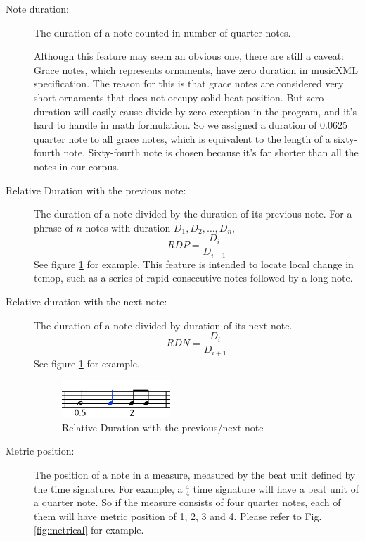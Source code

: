 \begin{description}
         
         \item [Note duration:] The duration of a note counted in number of quarter notes. 
            
            Although this feature may seem an obvious one, there are still a caveat: Grace notes, which represents ornaments, have zero duration in musicXML specification. The reason for this is that grace notes are considered very short ornaments that does not occupy solid beat position. But zero duration will easily cause divide-by-zero exception in the program, and it's hard to handle in math formulation. So we assigned a duration of 0.0625 quarter note to all grace notes, which is equivalent to the length of a sixty-fourth note. Sixty-fourth note is chosen because it's far shorter than all the notes in our corpus.
         \item [Relative Duration with the previous note:] The duration of a note divided by the duration of its previous note. For a phrase of $n$ notes with duration $D_1, D_2, \dots, D_n$, $$RDP = \frac{D_i}{D_{i-1}} $$ See figure \ref{fig:duration} for example.
            This feature is intended to locate local change in temop, such as a series of rapid consecutive notes followed by a long note.
         \item [Relative duration with the next note:] The duration of a note divided by duration of its next note. $$RDN = \frac{D_i}{D_{i+1}} $$ See figure \ref{fig:duration} for example.

      \begin{figure}[tp]
         \begin{center}
            \includegraphics[width=0.4\textwidth]{fig/duration}
         \end{center}
         \caption{Relative Duration with the previous/next note}
         \label{fig:duration}
      \end{figure}
   \item [Metric position:] The position of a note in a measure, measured by the beat unit defined by the time signature. For example, a $^4_4$ time signature will have a beat unit of a quarter note. So if the measure consists of four quarter notes, each of them will have metric position of 1, 2, 3 and 4. Please refer to Fig. \ref{fig:metrical} for example.
      

\end{description}
